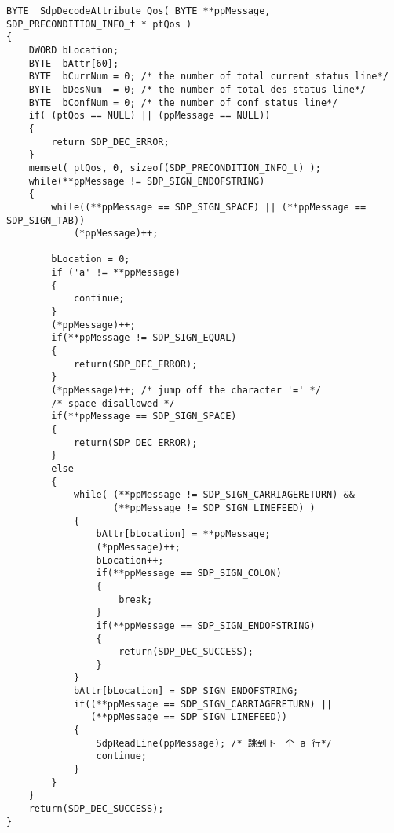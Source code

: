 ﻿\documentclass  [11pt,twocolumn]{article}
\begin{document}
\begin{lstlisting}
BYTE  SdpDecodeAttribute_Qos( BYTE **ppMessage, SDP_PRECONDITION_INFO_t * ptQos )
{
    DWORD bLocation;
    BYTE  bAttr[60];
    BYTE  bCurrNum = 0; /* the number of total current status line*/
    BYTE  bDesNum  = 0; /* the number of total des status line*/
    BYTE  bConfNum = 0; /* the number of conf status line*/
    if( (ptQos == NULL) || (ppMessage == NULL)) 
    {   
        return SDP_DEC_ERROR;
    }    
    memset( ptQos, 0, sizeof(SDP_PRECONDITION_INFO_t) );    
    while(**ppMessage != SDP_SIGN_ENDOFSTRING) 
    {
        while((**ppMessage == SDP_SIGN_SPACE) || (**ppMessage == SDP_SIGN_TAB)) 
            (*ppMessage)++;
        
        bLocation = 0;
        if ('a' != **ppMessage)
        {
            continue; 
        }
        (*ppMessage)++;   
        if(**ppMessage != SDP_SIGN_EQUAL)
        {    
            return(SDP_DEC_ERROR); 
        }
        (*ppMessage)++; /* jump off the character '=' */    
        /* space disallowed */ 
        if(**ppMessage == SDP_SIGN_SPACE)
        {    
            return(SDP_DEC_ERROR); 
        }
        else
        {
            while( (**ppMessage != SDP_SIGN_CARRIAGERETURN) && 
                   (**ppMessage != SDP_SIGN_LINEFEED) )
            {
                bAttr[bLocation] = **ppMessage;
                (*ppMessage)++;
                bLocation++;
                if(**ppMessage == SDP_SIGN_COLON)
                {    
                    break;
                }
                if(**ppMessage == SDP_SIGN_ENDOFSTRING)
                {    
                    return(SDP_DEC_SUCCESS);
                }
            }
            bAttr[bLocation] = SDP_SIGN_ENDOFSTRING;
            if((**ppMessage == SDP_SIGN_CARRIAGERETURN) || 
               (**ppMessage == SDP_SIGN_LINEFEED))
            {
                SdpReadLine(ppMessage); /* 跳到下一个 a 行*/
                continue; 
            }
        }
    }
    return(SDP_DEC_SUCCESS);
}
\end{lstlisting}

\pagebreak
\subsection{}
\end{document}
